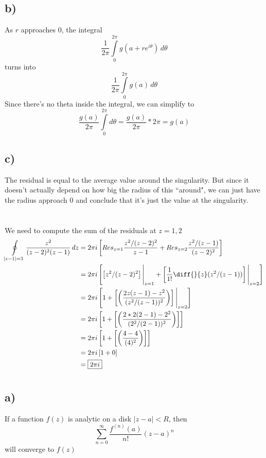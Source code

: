 \documentclass[12pt]{article}
\begin{document}
\subsection{b)}
As $ r $ approaches 0, the integral \[ \dfrac{1}{2\pi} \int\limits_{0}^{2\pi} g(a + re^{i\theta}) \,d\theta \] turns into \[ \dfrac{1}{2\pi} \int\limits_{0}^{2\pi} g(a) \,d\theta \] Since there's no theta inside the integral, we can simplify to \[ \dfrac{g(a)}{2\pi}  \int\limits_{0}^{2\pi} d\theta = \dfrac{g(a)}{2\pi} * 2\pi = g(a) \]

\subsection{c)}
The residual is equal to the average value around the singularity. But since it doesn't actually depend on how big the radius of this ``around", we can just have the radius approach 0 and conclude that it's just the value at the singularity.

\newpage
\section{}
We need to compute the sum of the residuals at $ z=1, 2 $
\begin{align*}
	\oint\limits_{|z-1|=3} \dfrac{z^2}{(z-2)^{2}(z-1)} \,dz &= 2\pi i \left[ Res_{z=1} \dfrac{z^2/(z-2)^2}{z-1} + Res_{z=2} \dfrac{z^2/(z-1)}{(z-2)^2} \right] \\
	&= 2\pi i\left[ \left[z^2/(z-2)^2\right] \Bigg|_{z=1} + \left[\dfrac{1}{1!} \diff{}{z} (z^2/(z-1))\right] \Bigg|_{z=2} \right]\\
	&= 2\pi i\left[ 1 + \left[ \left(\dfrac{2z(z-1) - z^2}{(z^2/(z-1))^2}\right)\right] \Bigg|_{z=2} \right]\\
	&= 2\pi i\left[ 1 + \left[ \left(\dfrac{2*2(2-1) - 2^2}{(2^2/(2-1))^2}\right)\right]\right]\\
	&= 2\pi i\left[ 1 + \left[ \left(\dfrac{4 - 4}{(4)^2}\right)\right] \right]\\
	&= 2\pi i\left[ 1 + 0 \right]\\
	&= \boxed{2\pi i}
\end{align*}
\newpage

\section{}
\subsection{a)}
If a function $ f(z) $ is analytic on a disk $ |z - a| < R $, then \[ \sum\limits_{n=0}^{\infty} \dfrac{f^{(n)}(a)}{n!}(z-a)^{n}\] will converge to $ f(z) $
\end{document}
